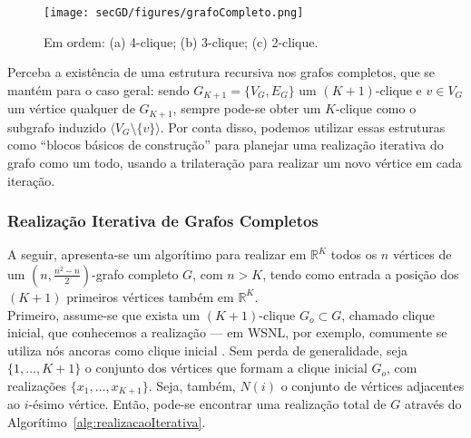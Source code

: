 \begin{figure}[H]
	\begin{center}
		\texttt{[image: secGD/figures/grafoCompleto.png]}
	\end{center}
	\caption{Em ordem: (a) 4-clique; (b) 3-clique; (c) 2-clique.}
	\label{fig:grafoCompleto}
\end{figure}

Perceba a existência de uma estrutura recursiva nos grafos completos, que se mantém para o caso geral: sendo $G_{K+1} = \{V_G, E_G\}$ um $(K+1)$-clique e $v \in V_G$ um vértice qualquer de $G_{K+1}$, sempre pode-se obter um $K$-clique como o subgrafo induzido $\langle V_G \setminus \{v\}\rangle$. Por conta disso, podemos utilizar essas estruturas como ``blocos básicos de construção'' para planejar uma realização iterativa do grafo como um todo, usando a trilateração para realizar um novo vértice em cada iteração. 




\subsubsection{Realização Iterativa de Grafos Completos}

A seguir, apresenta-se um algorítimo para realizar em $\mathbb{R}^K$ todos os $n$ vértices de um $(n,\frac{n^2 -n}{2})$-grafo completo $G$, com $n > K$, tendo como entrada a posição dos $(K+1)$ primeiros vértices também em $\mathbb{R}^{K}$.
\\

Primeiro, assume-se que exista um $(K+1)$-clique $G_o \subset G$, chamado clique inicial, que conhecemos a realização --- em WSNL, por exemplo, comumente se utiliza nós ancoras como clique inicial \cite{eren2004rigidity, savvides2001dynamic}. Sem perda de generalidade, seja $\{1,\dots,K+1\}$ o conjunto dos vértices que formam a clique inicial $G_o$, com realizações $\{x_1, \dots,x_{K+1}\}$. Seja, também, $N(i)$ o conjunto de vértices adjacentes ao $i$-ésimo vértice. Então, pode-se encontrar uma realização total de $G$ através do Algorítimo~\ref{alg:realizacaoIterativa}. 
\\

